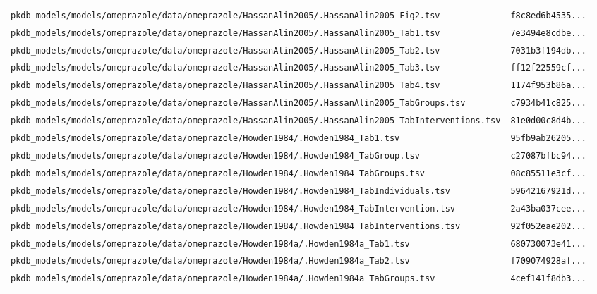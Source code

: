 \documentclass{article}
\begin{document}
\begin{longtable}{ll}
\texttt{pkdb\_models/models/omeprazole/data/omeprazole/HassanAlin2005/.HassanAlin2005\_Fig2.tsv} & \texttt{f8c8ed6b4535...} \\
\texttt{pkdb\_models/models/omeprazole/data/omeprazole/HassanAlin2005/.HassanAlin2005\_Tab1.tsv} & \texttt{7e3494e8cdbe...} \\
\texttt{pkdb\_models/models/omeprazole/data/omeprazole/HassanAlin2005/.HassanAlin2005\_Tab2.tsv} & \texttt{7031b3f194db...} \\
\texttt{pkdb\_models/models/omeprazole/data/omeprazole/HassanAlin2005/.HassanAlin2005\_Tab3.tsv} & \texttt{ff12f22559cf...} \\
\texttt{pkdb\_models/models/omeprazole/data/omeprazole/HassanAlin2005/.HassanAlin2005\_Tab4.tsv} & \texttt{1174f953b86a...} \\
\texttt{pkdb\_models/models/omeprazole/data/omeprazole/HassanAlin2005/.HassanAlin2005\_TabGroups.tsv} & \texttt{c7934b41c825...} \\
\texttt{pkdb\_models/models/omeprazole/data/omeprazole/HassanAlin2005/.HassanAlin2005\_TabInterventions.tsv} & \texttt{81e0d00c8d4b...} \\
\texttt{pkdb\_models/models/omeprazole/data/omeprazole/Howden1984/.Howden1984\_Tab1.tsv} & \texttt{95fb9ab26205...} \\
\texttt{pkdb\_models/models/omeprazole/data/omeprazole/Howden1984/.Howden1984\_TabGroup.tsv} & \texttt{c27087bfbc94...} \\
\texttt{pkdb\_models/models/omeprazole/data/omeprazole/Howden1984/.Howden1984\_TabGroups.tsv} & \texttt{08c85511e3cf...} \\
\texttt{pkdb\_models/models/omeprazole/data/omeprazole/Howden1984/.Howden1984\_TabIndividuals.tsv} & \texttt{59642167921d...} \\
\texttt{pkdb\_models/models/omeprazole/data/omeprazole/Howden1984/.Howden1984\_TabIntervention.tsv} & \texttt{2a43ba037cee...} \\
\texttt{pkdb\_models/models/omeprazole/data/omeprazole/Howden1984/.Howden1984\_TabInterventions.tsv} & \texttt{92f052eae202...} \\
\texttt{pkdb\_models/models/omeprazole/data/omeprazole/Howden1984a/.Howden1984a\_Tab1.tsv} & \texttt{680730073e41...} \\
\texttt{pkdb\_models/models/omeprazole/data/omeprazole/Howden1984a/.Howden1984a\_Tab2.tsv} & \texttt{f709074928af...} \\
\texttt{pkdb\_models/models/omeprazole/data/omeprazole/Howden1984a/.Howden1984a\_TabGroups.tsv} & \texttt{4cef141f8db3...} \\

\end{longtable}
\end{document}
